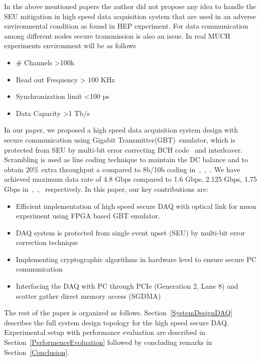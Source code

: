 \documentclass[a4paper]{jpconf}
\begin{document}
\par
In the above mentioned papers the author did not propose any idea to handle the SEU mitigation in high speed data acquisition system that are used in an adverse environmental condition as found in HEP experiment. For data communication among different nodes secure transmission is also an issue. In real MUCH experiments environment will be as follows
\begin{itemize}
\item \# Channels >100k
\item Read out Frequency > 100 KHz
\item Synchronization limit <100 ps
\item Data Capacity >1 Tb/s
\end{itemize}
In our paper, we proposed a high speed data acquisition system design with secure communication using Gigabit Transmitter(GBT)~\cite{GBT:ref1}emulator, which is protected from SEU by multi-bit error correcting BCH code~\cite{chien:search}  and interleaver. Scrambling is used as line coding technique to maintain the DC balance and to obtain 20\% extra throughput a compared to 8b/10b coding in~\cite{Minami:ieeetran:2011},~\cite{kadric:socc:2012},~\cite{Liu:i2mtc:2013:X}. We have achieved maximum data rate of 4.8 Gbps compared to 1.6 Gbps, 2.125 Gbps, 1.75 Gbps in~\cite{Minami:ieeetran:2011},~\cite{Liu:i2mtc:2013:X},~\cite{haoxu:nss:2007:XX} respectively.
In this paper, our key contributions are:
\begin{itemize}
\item Efficient implementation of high speed
secure DAQ with optical link for muon experiment using FPGA based GBT emulator.
\item DAQ system is protected from single event upset (SEU)
by multi-bit error correction technique
\item Implementing cryptographic algorithms in hardware level to ensure secure PC communication
\item Interfacing the DAQ with PC through PCIe (Generation
2, Lane 8) and scatter gather direct memory access
(SGDMA)

\end{itemize}   
The rest of the paper is organized as follows. Section~\ref{SystemDesignDAQ} describes the full system design topology for the high speed secure DAQ. Experimental setup with performance evaluation are described in Section~\ref{PerformenceEvoluation} followed by concluding remarks in Section~\ref{Conclusion}.
\vspace{-1 pc}
\end{document}
